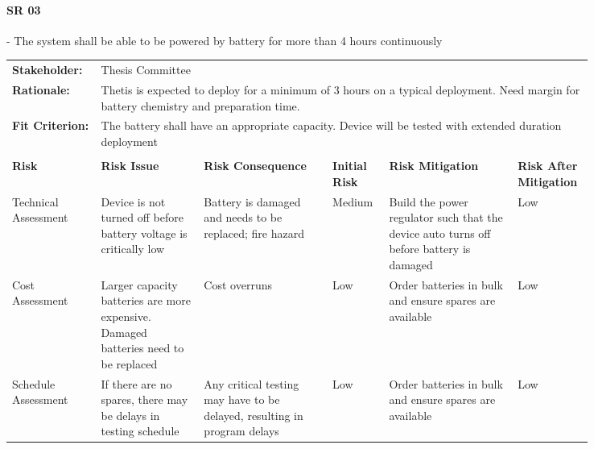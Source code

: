 \begin{landscape}


\paragraph*{SR 03} - The system shall be able to be powered by battery for more than 4 hours continuously

{\fontsize{8pt}{8pt}\selectfont
\begin{longtable}{| p{0.12\linewidth} | p{0.16\linewidth} |  p{0.20\linewidth} | p{0.08\linewidth} | p{0.20\linewidth} | p{0.08\linewidth} |}
	\hline \endlastfoot
	
	\hline
	\rowcolor[gray]{0.8}
	\multicolumn{6}{|c|}{ } \\
	\hline
	\textbf{Stakeholder:} & \multicolumn{5}{|l|}{Thesis Committee} \\
	\hline
	\textbf{Rationale:} & \multicolumn{5}{|p{0.8\linewidth}|}{Thetis is expected to deploy for a minimum of 3 hours on a typical deployment. Need margin for battery chemistry and preparation time.} \\
	\hline
	\textbf{Fit Criterion:} & \multicolumn{5}{|p{0.8\linewidth}|}{The battery shall have an appropriate capacity. Device will be tested with extended duration deployment} \\
	\hline
	\rowcolor[gray]{0.8}
	\multicolumn{6}{|c|}{ } \\
	\hline
	\textbf{Risk} & \textbf{Risk Issue} & \textbf{Risk Consequence} & \textbf{Initial Risk} & \textbf{Risk Mitigation} & \textbf{Risk \newline After \newline Mitigation} \\
	\hline
	Technical \newline Assessment & Device is not turned off before battery voltage is critically low & Battery is damaged and needs to be replaced; fire hazard & \cellcolor{yellow} Medium & Build the power regulator such that the device auto turns off before battery is damaged & \cellcolor{green} Low \\
	\hline
	Cost \newline Assessment & Larger capacity batteries are more expensive. \newline Damaged batteries need to be replaced & Cost overruns & \cellcolor{green} Low & Order batteries in bulk and ensure spares are available & \cellcolor{green} Low \\
	\hline
	Schedule \newline Assessment & If there are no spares, there may be delays in testing schedule & Any critical testing may have to be delayed, resulting in program delays & \cellcolor{green} Low & Order batteries in bulk and ensure spares are available & \cellcolor{green} Low \\

\end{longtable}}
\end{landscape}
